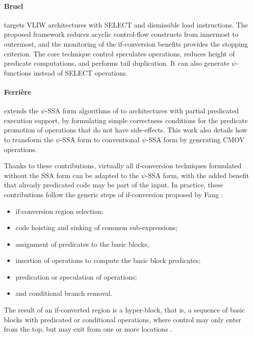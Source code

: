 \paragraph{Bruel \cite{Bruel:2006:ODES}} targets VLIW architectures with SELECT and
dismissible load instructions. The proposed framework reduces acyclic
control-flow constructs from innermost to outermost, and the monitoring of the
if-conversion benefits provides the stopping criterion. The core technique
control speculates operations, reduces height of predicate computations, and
performs tail duplication. It can also generate $\psi$-functions instead of
SELECT operations. %

\paragraph{Ferri\`ere \cite{Ferriere:2007:SCOPES}} extends the $\psi$-SSA form
algorithms of \cite{Stoutchinin:2001:MICRO} to architectures with partial
predicated execution support, by formulating simple correctness conditions for
the predicate promotion of operations that do not have side-effects. This work
also details how to transform the $\psi$-SSA form to conventional $\psi$-SSA
form by generating CMOV operations.

\medskip
Thanks to these contributions, virtually all if-conversion techniques formulated
without the SSA form can be adapted to the $\psi$-SSA form, with the added
benefit that already predicated code may be part of the input. In practice, these
contributions follow the generic steps of if-conversion proposed by Fang
\cite{Fang:1996:LCPC}:
\begin{itemize}
\item if-conversion region selection;
\item code hoisting and sinking of common sub-expressions;
\item assignment of predicates to the basic blocks;
\item insertion of operations to compute the basic block predicates;
\item predication or speculation of operations;
\item and conditional branch removal.
\end{itemize}
The result of an if-converted region is a hyper-block, that is, a sequence of
basic blocks with predicated or conditional operations, where control may only
enter from the top, but may exit from one or more locations
\cite{Mahlke:1992:MICRO}.

